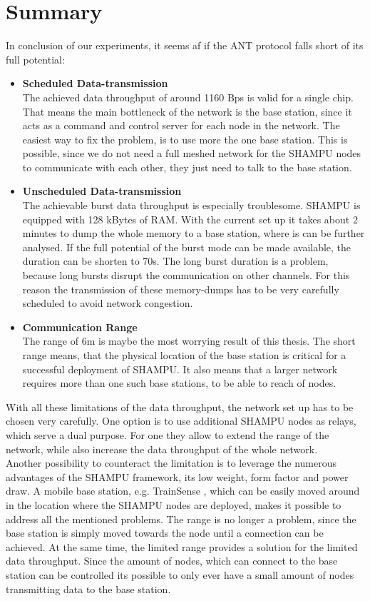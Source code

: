 \section{Summary}
In conclusion of our experiments, it seems af if the ANT protocol falls short of its full potential:
\begin{itemize}
	\item{\textbf{Scheduled Data-transmission}} \hfill \\ The achieved data throughput of around 1160 Bps is valid for a single chip. That means the main bottleneck of the network is the base station, since it acts as a command and control server for each node in the network. The easiest way to fix the problem, is to use more the one base station. This is possible, since we do not need a full meshed network for the SHAMPU nodes to communicate with each other, they just need to talk to the base station.
	\item{\textbf{Unscheduled Data-transmission}} \hfill \\ The achievable burst data throughput is especially troublesome. SHAMPU is equipped with 128 kBytes of RAM. With the current set up it takes about 2 minutes to dump the whole memory to a base station, where is can be further analysed. If the full potential of the burst mode can be made available, the duration can be shorten to 70s. The long burst duration is a problem, because long bursts disrupt the communication on other channels. For this reason the transmission of these memory-dumps has to be very carefully scheduled to avoid network congestion.
	\item{\textbf{Communication Range}} \hfill \\ The range of 6m is maybe the most worrying result of this thesis. The short range means, that the physical location of the base station is critical for a successful deployment of SHAMPU. It also means that a larger network requires more than one such base stations, to be able to reach of nodes.
\end{itemize}


With all these limitations of the data throughput, the network set up has to be chosen very carefully. One option is to use additional SHAMPU nodes as relays, which serve a dual purpose. For one they allow to extend the range of the network, while also increase the data throughput of the whole network.\\ Another possibility to counteract the limitation is to leverage the numerous advantages of the SHAMPU framework, its low weight, form factor and power draw. A mobile base station, e.g. TrainSense \cite{Smeets:2013:TNI:2450070.2450072}, which can be easily moved around in the location where the SHAMPU nodes are deployed, makes it possible to address all the mentioned problems. The range is no longer a problem, since the base  station is simply moved towards the node until a connection can be achieved. At the same time, the limited range provides a solution for the limited data throughput. Since the amount of nodes, which can connect to the base station can be controlled its possible to only ever have a small amount of nodes transmitting data to the base station.

